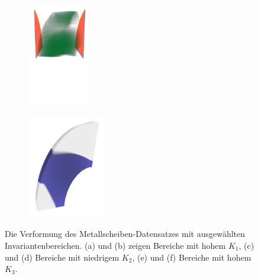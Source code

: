 \documentclass[a4paper,fontsize=12pt,toc=bib,halfparskip]{scrartcl}
\begin{document}
\begin{figure}
\begin{subfigure}{0.49\textwidth}
		\subcaption{}
		\label{MetalDiskStrainObject2}
	\end{subfigure}
	\medskip
	\begin{subfigure}{0.49\textwidth}
		\centering
		\includegraphics[height=4.5cm]{pictures/results/MetalDiskStrain_InvariantSpace3.png}
		\subcaption{}
		\label{MetalDiskStrainInvariant3}
	\end{subfigure}
	\hspace*{\fill}
	\begin{subfigure}{0.49\textwidth}
		\centering
		\includegraphics[height=4.5cm]{pictures/results/MetalDiskStrain_Object3.png}
		\subcaption{}
		\label{MetalDiskStrainObject3}
	\end{subfigure}
	\caption{Die Verformung des Metallscheiben-Datensatzes mit ausgew\"ahlten Invariantenbereichen. (a) und (b) zeigen Bereiche mit hohem $K_1$, (c) und (d) Bereiche mit niedrigem $K_2$, (e) und (f) Bereiche mit hohem $K_3$.}
	\label{MetalDiskStrainInteraction}
\end{figure}
\end{document}
